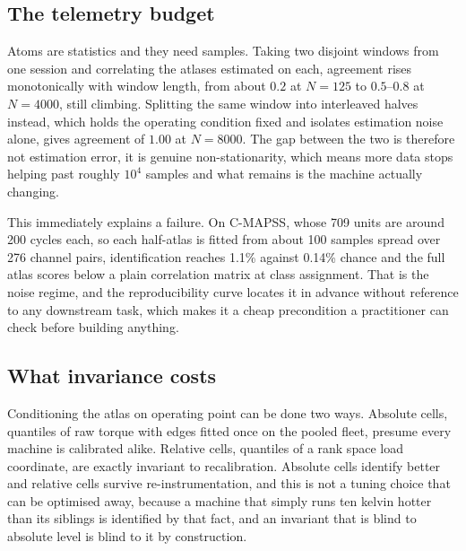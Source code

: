 \documentclass[11pt]{article}
\begin{document}
\subsection{The telemetry budget}

Atoms are statistics and they need samples. Taking two disjoint windows from
one session and correlating the atlases estimated on each, agreement rises
monotonically with window length, from about $0.2$ at $N=125$ to $0.5$--$0.8$
at $N=4000$, still climbing. Splitting the same window into interleaved halves
instead, which holds the operating condition fixed and isolates estimation
noise alone, gives agreement of $1.00$ at $N=8000$. The gap between the two is
therefore not estimation error, it is genuine non-stationarity, which means
more data stops helping past roughly $10^4$ samples and what remains is the
machine actually changing.

This immediately explains a failure. On C-MAPSS, whose 709 units are around 200
cycles each, so each half-atlas is fitted from about 100 samples spread over
276 channel pairs, identification reaches 1.1\% against 0.14\% chance and the
full atlas scores below a plain correlation matrix at class assignment. That is
the noise regime, and the reproducibility curve locates it in advance without
reference to any downstream task, which makes it a cheap precondition a
practitioner can check before building anything.

\subsection{What invariance costs}

Conditioning the atlas on operating point can be done two ways. Absolute cells,
quantiles of raw torque with edges fitted once on the pooled fleet, presume
every machine is calibrated alike. Relative cells, quantiles of a rank space
load coordinate, are exactly invariant to recalibration. Absolute cells
identify better and relative cells survive re-instrumentation, and this is not
a tuning choice that can be optimised away, because a machine that simply runs
ten kelvin hotter than its siblings is identified by that fact, and an
invariant that is blind to absolute level is blind to it by construction.
\end{document}
